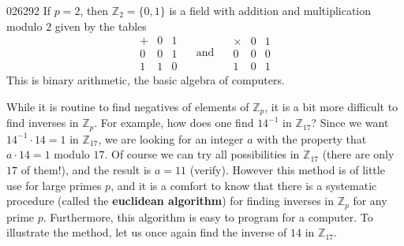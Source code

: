 \begin{example}{}{026292}
If $p = 2$, then $\mathbb{Z}_2 = \{0, 1\}$ is a field with addition and multiplication modulo $2$ given by the tables
\begin{equation*}
\begin{array}{c|cc}
+ & 0 & 1 \\ \hline
0 & 0 & 1 \\
1 & 1 & 0
\end{array} \quad \mbox{ and } \quad
\begin{array}{c|cc}
\times & 0 & 1 \\ \hline
0 & 0 & 0 \\
1 & 0 & 1
\end{array}
\end{equation*}
This is binary arithmetic, the basic algebra of computers.
\end{example}

While it is routine to find negatives of elements of $\mathbb{Z}_p$, it is a bit more difficult to find inverses in $\mathbb{Z}_p$. For example, how does one find $14^{-1}$ in $\mathbb{Z}_{17}$? Since we want $14^{-1} \cdot 14 = 1$ in $\mathbb{Z}_{17}$, we are looking for an integer $a$ with the property that $a \cdot 14 = 1$ modulo $17$. Of course we can try all possibilities in $\mathbb{Z}_{17}$ (there are only $17$ of them!), and the result is $a = 11$ (verify). However this method is of little use for large primes $p$, and it is a comfort to know that there is a systematic procedure (called the \textbf{euclidean algorithm}) for finding inverses in $\mathbb{Z}_p$ for any prime $p$. Furthermore, this algorithm is easy to program for a computer. To illustrate the method, let us once again find the inverse of $14$ in $\mathbb{Z}_{17}$.

